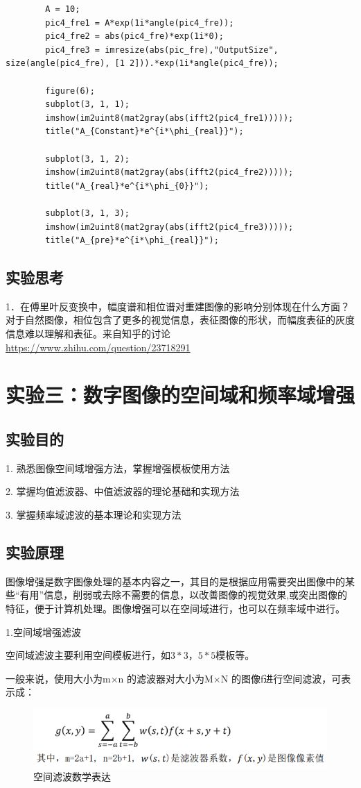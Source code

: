 \documentclass[UTF8]{article} %
\begin{document}
\begin{lstlisting}[style=Matlab-editor]
		%% different combination
		A = 10;
		pic4_fre1 = A*exp(1i*angle(pic4_fre));
		pic4_fre2 = abs(pic4_fre)*exp(1i*0);
		pic4_fre3 = imresize(abs(pic_fre),"OutputSize", size(angle(pic4_fre), [1 2])).*exp(1i*angle(pic4_fre));
		
		figure(6);
		subplot(3, 1, 1);
		imshow(im2uint8(mat2gray(abs(ifft2(pic4_fre1)))));
		title("A_{Constant}*e^{i*\phi_{real}}");
		
		subplot(3, 1, 2);
		imshow(im2uint8(mat2gray(abs(ifft2(pic4_fre2)))));
		title("A_{real}*e^{i*\phi_{0}}");
		
		subplot(3, 1, 3);
		imshow(im2uint8(mat2gray(abs(ifft2(pic4_fre3)))));
		title("A_{pre}*e^{i*\phi_{real}}");
	\end{lstlisting}
	
	\subsection{实验思考}
	1．在傅里叶反变换中，幅度谱和相位谱对重建图像的影响分别体现在什么方面？
	对于自然图像，相位包含了更多的视觉信息，表征图像的形状，而幅度表征的灰度信息难以理解和表征。来自知乎的讨论\url{https://www.zhihu.com/question/23718291}
	
	\section{实验三：数字图像的空间域和频率域增强}
	\subsection{实验目的}
	1. 熟悉图像空间域增强方法，掌握增强模板使用方法
	
	2. 掌握均值滤波器、中值滤波器的理论基础和实现方法
	
	3. 掌握频率域滤波的基本理论和实现方法
	
	\subsection{实验原理}
	图像增强是数字图像处理的基本内容之一，其目的是根据应用需要突出图像中的某些“有用”信息，削弱或去除不需要的信息，以改善图像的视觉效果,或突出图像的特征，便于计算机处理。图像增强可以在空间域进行，也可以在频率域中进行。
	
	1.空间域增强滤波
	
	空间域滤波主要利用空间模板进行，如$3*3$，$5*5$模板等。
	
	一般来说，使用大小为m×n 的滤波器对大小为M×N 的图像f进行空间滤波，可表示成： 
	\begin{figure}[H]
		\centering
		\includegraphics[width=0.7\linewidth]{screenshot038}
		\caption{空间滤波数学表达}
		\label{fig:screenshot038}
	\end{figure}
\end{document}
